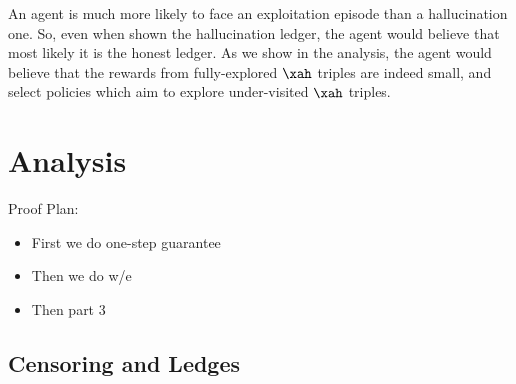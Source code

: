 
An agent is much more likely to face an exploitation episode than a hallucination one. So, even when shown the hallucination ledger, the agent would believe that most likely it is the honest ledger. As we show in the analysis, the agent would believe that the rewards from fully-explored $\xah$ triples are indeed small, and select policies which aim to explore under-visited $\xah$ triples.


%



\newcommand{\ledcenslhat}[1][\ell]{\hat{\bm{\ledger}}_{\mathrm{cens};#1}}
\newcommand{\ledhonlhat}[1][\ell]{\hat{\bm{\ledger}}_{\mathrm{hon};#1}}
\newcommand{\ledhallhat}[1][\ell]{\hat{\bm{\ledger}}_{\mathrm{hal};#1}}





\section{Analysis}
Proof Plan:
\begin{itemize}
	\item First we do one-step guarantee
	\item Then we do w/e
	\item Then part 3
\end{itemize}


\newcommand{\cce}{\texttt{CanConE}}
\newcommand{\cces}{\texttt{CanConE}s}


\subsection{Censoring and Ledges}


